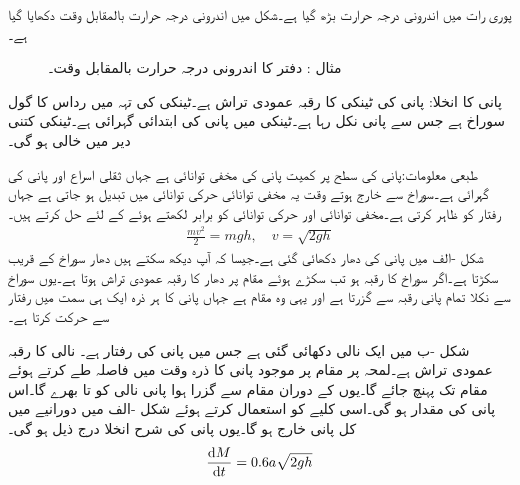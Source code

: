 پوری رات میں اندرونی درجہ حرارت  بڑھ گیا ہے۔شکل  میں اندرونی درجہ حرارت بالمقابل وقت دکھایا گیا ہے۔
\begin{figure}
\centering
{}
\caption{مثال : دفتر کا اندرونی درجہ حرارت بالمقابل وقت۔}
\label{شکل_مثال_سادہ_اول_نیوٹن_قانون_ٹھنڈک}
\end{figure}
 \quad پانی کا انخلا:
پانی کی ٹینکی کا رقبہ عمودی تراش  ہے۔ٹینکی کی تہہ میں  رداس کا گول سوراخ ہے جس سے پانی نکل رہا ہے۔ٹینکی میں پانی کی ابتدائی گہرائی  ہے۔ٹینکی کتنی دیر میں خالی ہو گی۔

طبعی معلومات:پانی کی سطح پر  کمیت پانی کی مخفی توانائی  ہے جہاں  ثقلی اسراع اور  پانی کی گہرائی ہے۔سوراخ سے خارج ہوتے وقت یہ مخفی توانائی  حرکی توانائی  میں تبدیل ہو جاتی ہے جہاں  رفتار کو ظاہر کرتی ہے۔مخفی توانائی اور حرکی توانائی کو برابر لکھتے ہوئے  کے لئے حل کرتے ہیں۔
\begin{align*}
\frac{mv^2}{2}=mgh,\quad v=\sqrt{2gh}
\end{align*}
شکل -الف میں پانی کی دھار دکھائی گئی ہے۔جیسا کہ آپ دیکھ سکتے ہیں دھار سوراخ کے قریب سکڑتا ہے۔اگر سوراخ کا رقبہ  ہو تب سکڑے  ہوئے مقام پر دھار کا رقبہ عمودی تراش  ہوتا ہے۔یوں سوراخ سے نکلا تمام پانی رقبہ  سے گزرتا ہے اور یہی وہ مقام ہے جہاں پانی کا ہر ذرہ ایک ہی سمت میں رفتار  سے حرکت کرتا ہے۔

شکل -ب میں ایک نالی دکھائی گئی ہے جس میں پانی کی رفتار  ہے۔ نالی کا رقبہ عمودی تراش  ہے۔لمحہ  پر  مقام  پر موجود پانی کا ذرہ وقت  میں  فاصلہ طے کرتے ہوئے مقام  تک پہنچ جائے گا۔یوں  کے دوران مقام  سے گزرا ہوا پانی نالی کو  تا  بھرے گا۔اس پانی کی مقدار  ہو گی۔اسی کلیے کو استعمال کرتے ہوئے شکل -الف میں  دورانیے میں کل  پانی خارج ہو گا۔یوں پانی کی شرح انخلا درج ذیل ہو گی۔
 \begin{align}\label{مساوات_سادہ_اول_ٹورا_سلی}
\frac{\dif M}{\dif t}=0.6a\sqrt{2gh}
\end{align}
 
